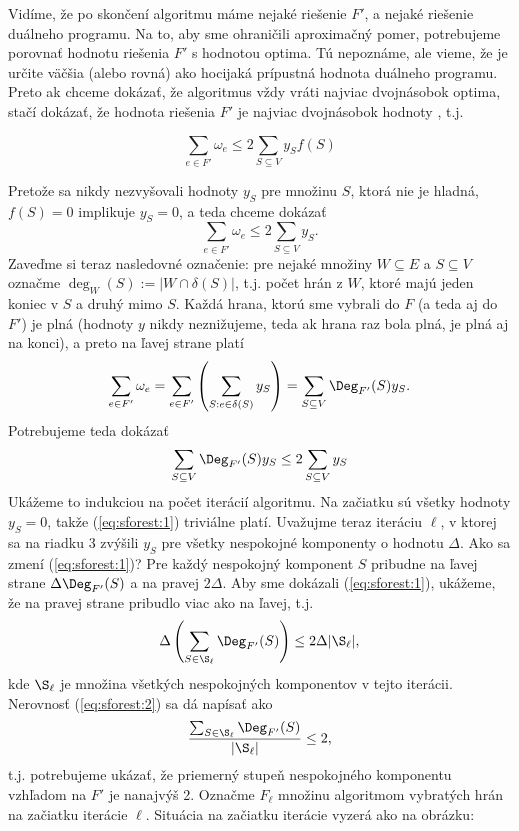 \noindent Vidíme, že po skončení algoritmu máme nejaké riešenie $F'$, a nejaké
riešenie  duálneho programu.  Na to, aby sme ohraničili aproximačný
pomer, potrebujeme porovnať hodnotu riešenia $F'$ s hodnotou optima.  Tú
nepoznáme, ale vieme, že je určite väčšia (alebo rovná) ako hocijaká prípustná
hodnota duálneho programu.  Preto ak chceme dokázať, že algoritmus vždy vráti
najviac dvojnásobok optima, stačí dokázať, že hodnota riešenia $F'$ je najviac
dvojnásobok hodnoty , t.j.

\begin{veta}
  $$\sum_{e\in F'}\omega_e \le 2 \sum_{S\subseteq V}y_Sf(S)$$
\end{veta}

\begin{dokaz}
  Pretože sa nikdy nezvyšovali hodnoty $y_S$ pre množinu $S$, ktorá nie je
  hladná,  $f(S)=0$ implikuje  $y_S=0$, a teda chceme dokázať $$\sum_{e\in
  F'}\omega_e \le 2 \sum_{S\subseteq V}y_S.$$ 
  Zaveďme si teraz nasledovné označenie: pre nejaké množiny $W\subseteq E$ a $S\subseteq V$ 
  označme  $\deg_W(S):=|W\cap\delta(S)|$, t.j. počet hrán z $W$, ktoré majú jeden koniec v $S$ a druhý mimo $S$.
  Každá hrana, ktorú sme vybrali do
  $F$ (a teda aj do $F'$) je plná (hodnoty $y$ nikdy neznižujeme, teda ak hrana
  raz bola plná, je plná aj na konci), a preto na ľavej strane platí 
  $$\sum_{e\in F'}\omega_e=\sum_{e\in F'}\left(\sum_{S:e\in\delta(S)}y_S\right)
  =\sum_{S\subseteq V}\Deg_{F'}(S)y_S
  .$$
  Potrebujeme teda dokázať
  \begin{equation}
    \label{eq:sforest:1}
    \sum_{S\subseteq V}\Deg_{F'}(S)y_S\le 2 \sum_{S\subseteq V}y_S
  \end{equation}
  Ukážeme to indukciou na počet iterácií algoritmu. Na začiatku
  sú všetky hodnoty $y_S=0$, takže (\ref{eq:sforest:1}) triviálne platí. 
  Uvažujme teraz iteráciu $\ell$, v ktorej sa na riadku 3 zvýšili $y_S$ pre všetky nespokojné komponenty
  o hodnotu $\Delta$. Ako sa zmení (\ref{eq:sforest:1})? 
  Pre každý nespokojný komponent $S$ pribudne  
  na ľavej strane  $\Delta\Deg_{F'}(S)$
  a na pravej $2\Delta$. Aby sme dokázali  (\ref{eq:sforest:1}), ukážeme, že na pravej strane pribudlo viac ako
  na ľavej, t.j.
  \begin{equation}
     \label{eq:sforest:2}
  \Delta\left(\sum_{S\in\S_\ell}\Deg_{F'}(S)\right)
  \le 2\Delta|\S_\ell|,
\end{equation}
  kde $\S_\ell$ je množina všetkých nespokojných komponentov v tejto iterácii.
  Nerovnosť  (\ref{eq:sforest:2}) sa dá napísať ako
  $$\frac{\sum_{S\in\S_\ell}\Deg_{F'}(S)}{|\S_\ell|}\le2,$$
  t.j. potrebujeme ukázať, že priemerný stupeň nespokojného komponentu vzhľadom na $F'$ je nanajvýš 2.
  Označme $F_\ell$ množinu algoritmom vybratých hrán na začiatku iterácie $\ell$.
  Situácia na začiatku iterácie vyzerá ako na obrázku:


\end{dokaz}
